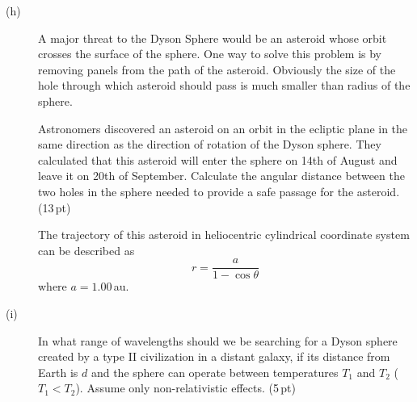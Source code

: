 \begin{description}
\item[(h)] A major threat to the Dyson Sphere would be an asteroid whose orbit
  crosses the surface of the sphere. One way to solve this problem is by
  removing panels from the path of the asteroid. Obviously the size of the
  hole through which asteroid should pass is much smaller than radius of the
  sphere.

  Astronomers discovered an asteroid on an orbit in the ecliptic plane in the
  same direction as the direction of rotation of the Dyson sphere. They
  calculated that this asteroid will enter the sphere on 14th of August and
  leave it on 20th of September. Calculate the angular distance between the
  two holes in the sphere needed to provide a safe passage for the asteroid.
  \hfill(13\,pt)

  The trajectory of this asteroid in heliocentric cylindrical coordinate
  system can be described as
  \[ r = \frac{a}{1 - \cos\theta} \]
  where $a = 1.00$\,au.
\item[(i)] In what range of wavelengths should we be searching for a Dyson
  sphere created by a type II civilization in a distant galaxy, if its
  distance from Earth is $d$ and the sphere can operate between temperatures
  $T_1$ and $T_2$ ($T_1 < T_2$). Assume only non-relativistic effects.
  \hfill(5\,pt)
\end{description}
